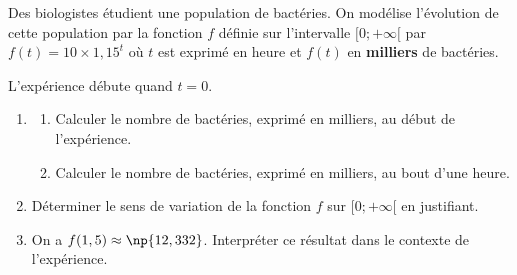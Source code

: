 Des biologistes étudient une population de bactéries. On modélise l'évolution de cette population par la fonction $f$ définie sur l'intervalle $[0 ; +\infty[$ par $f(t) = 10 \times 1,15^t$ où $t$ est exprimé en heure et $f(t)$ en \textbf{milliers} de bactéries.

L'expérience débute quand $t=0$.

\begin{enumerate}
	\item
	\begin{enumerate}
		\item Calculer le nombre de bactéries, exprimé en milliers, au début de l'expérience.
		\item Calculer le nombre de bactéries, exprimé en milliers, au bout d'une heure.
	\end{enumerate}
	\item Déterminer le sens de variation de la fonction $f$ sur $[0 ; +\infty[$ en justifiant.
	\item On a $f(1,5) \approx \np{12,332}$. Interpréter ce résultat dans le contexte de l'expérience.
\end{enumerate}
